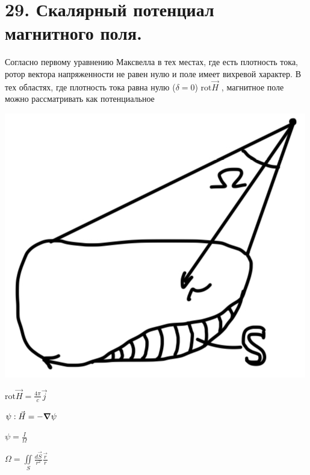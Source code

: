 \section*{29. Скалярный потенциал магнитного поля.}
 
Согласно первому уравнению Максвелла в тех местах, где есть плотность тока, ротор вектора напряженности не равен нулю и поле имеет вихревой характер. В тех областях, где плотность тока равна нулю ($\delta =0$) $\mathrm{rot}\vec{H}$  , магнитное поле можно рассматривать как потенциальное



\noindent
\begin{minipage}[c]{0.3\textwidth} %
    \includegraphics[width=\textwidth]{im/64.png}{} %
\end{minipage}%
\hfill
\begin{minipage}[c]{0.55\textwidth} %
    \( \mathrm{rot}\vec{H}=\frac{4\pi}{c}\vec{j}   \) 
    
    \( \psi: \vec{H}=-\grad \psi \)
    
    \( \psi = \frac{I}\Omega  \) 

    \( \Omega =\underset{S}{\iint}\frac{d\vec{S}}{r^2} \frac{\vec{r}}{r}   \) 
\end{minipage}
\[\text{ }\]
\noindent
